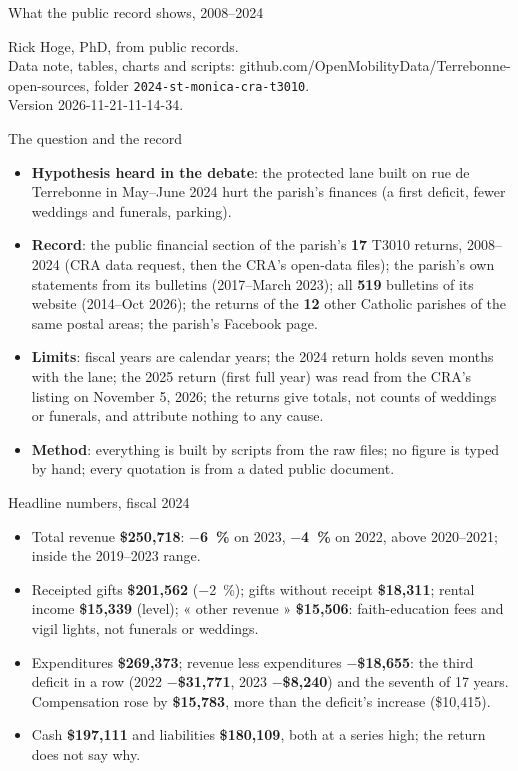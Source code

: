\documentclass[aspectratio=169,11pt]{beamer}
\newcommand{\docversion}{2026-11-21-11-14-34} %
\newcommand{\B}[1]{\textbf{#1}}
\begin{document}
\begin{frame}
\vspace{1.5em}{\LARGE\bfseries St Monica's parish finances\\and the Terrebonne bike lane}\par\bigskip
{\large What the public record shows, 2008--2024}\par\bigskip
{\small Rick Hoge, PhD, from public records.\\Data note, tables, charts and scripts: github.com/OpenMobilityData/Terrebonne-open-sources, folder \texttt{2024-st-monica-cra-t3010}.\\Version \docversion.}
\end{frame}

\begin{frame}{The question and the record}
\begin{itemize}
\item \B{Hypothesis heard in the debate}: the protected lane built on rue de Terrebonne in May--June 2024 hurt the parish's finances (a first deficit, fewer weddings and funerals, parking).
\item \B{Record}: the public financial section of the parish's \B{17} T3010 returns, 2008--2024 (CRA data request, then the CRA's open-data files); the parish's own statements from its bulletins (2017--March 2023); all \B{519} bulletins of its website (2014--Oct 2026); the returns of the \B{12} other Catholic parishes of the same postal areas; the parish's Facebook page.
\item \B{Limits}: fiscal years are calendar years; the 2024 return holds seven months with the lane; the 2025 return (first full year) was read from the CRA's listing on November 5, 2026; the returns give totals, not counts of weddings or funerals, and attribute nothing to any cause.
\item \B{Method}: everything is built by scripts from the raw files; no figure is typed by hand; every quotation is from a dated public document.
\end{itemize}
\end{frame}

\begin{frame}{Headline numbers, fiscal 2024}
\begin{itemize}
\item Total revenue \B{\$250,718}: \B{$-$6~\%} on 2023, \B{$-$4~\%} on 2022, above 2020--2021; inside the 2019--2023 range.
\item Receipted gifts \B{\$201,562} ($-$2~\%); gifts without receipt \B{\$18,311}; rental income \B{\$15,339} (level); « other revenue » \B{\$15,506}: faith-education fees and vigil lights, not funerals or weddings.
\item Expenditures \B{\$269,373}; revenue less expenditures \B{$-$\$18,655}: the third deficit in a row (2022 \B{$-$\$31,771}, 2023 \B{$-$\$8,240}) and the seventh of 17 years. Compensation rose by \B{\$15,783}, more than the deficit's increase (\$10,415).
\item Cash \B{\$197,111} and liabilities \B{\$180,109}, both at a series high; the return does not say why.
\end{itemize}
\end{frame}
\end{document}

